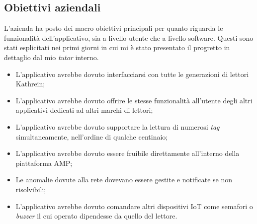 \subsection{Obiettivi aziendali}
L'azienda ha posto dei macro obiettivi principali per quanto riguarda le funzionalità dell'applicativo, sia a livello utente che a livello software. Questi sono stati
esplicitati nei primi giorni in cui mi è stato presentato il progretto in dettaglio dal mio \emph{tutor} interno.
\begin{itemize}
    \item L'applicativo avrebbe dovuto interfacciarsi con tutte le generazioni di lettori Kathrein;
    \item L'applicativo avrebbe dovuto offrire le stesse funzionalità all'utente degli altri applicativi dedicati ad altri marchi di lettori;
    \item L'applicativo avrebbe dovuto supportare la lettura di numerosi \emph{tag} simultaneamente, nell'ordine di qualche centinaio;
    \item L'applicativo avrebbe dovuto essere fruibile direttamente all'interno della piattaforma AMP;
    \item Le anomalie dovute alla rete dovevano essere gestite e notificate se non risolvibili;
    \item L'applicativo avrebbe dovuto comandare altri dispositivi IoT come semafori o \emph{buzzer} il cui operato dipendesse da quello del lettore.
\end{itemize}
